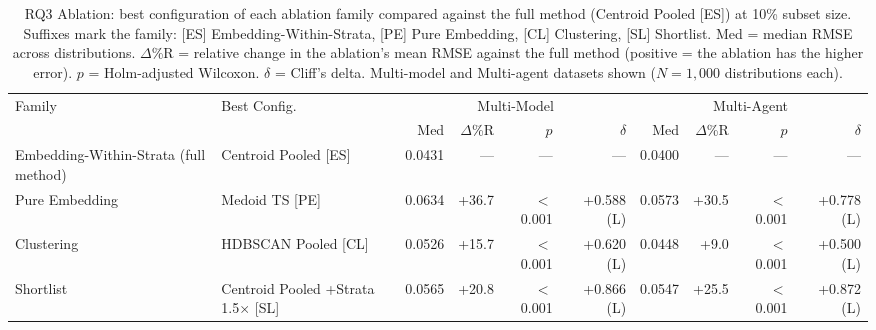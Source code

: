 \begin{table}[t]
\centering
\caption{RQ3 Ablation: best configuration of each ablation family compared against the full method (Centroid Pooled [ES]) at 10\% subset size. Suffixes mark the family: [ES] Embedding-Within-Strata, [PE] Pure Embedding, [CL] Clustering, [SL] Shortlist. Med = median RMSE across distributions. $\Delta$\%R = relative change in the ablation's mean RMSE against the full method (positive = the ablation has the higher error). $p$ = Holm-adjusted Wilcoxon. $\delta$ = Cliff's delta. Multi-model and Multi-agent datasets shown ($N{=}1{,}000$ distributions each).}
\label{tab:rq3-ablation}
\begin{tabular}{llrrrrrrrr}
\toprule
Family & Best Config. & \multicolumn{4}{c}{Multi-Model} & \multicolumn{4}{c}{Multi-Agent} \\
 &  & Med & $\Delta$\%R & $p$ & $\delta$ & Med & $\Delta$\%R & $p$ & $\delta$ \\
\midrule
Embedding-Within-Strata (full method) & Centroid Pooled [ES] & 0.0431 & --- & --- & --- & 0.0400 & --- & --- & --- \\
Pure Embedding & Medoid TS [PE] & 0.0634 & +36.7 & $<$0.001 & +0.588 (L) & 0.0573 & +30.5 & $<$0.001 & +0.778 (L) \\
Clustering & HDBSCAN Pooled [CL] & 0.0526 & +15.7 & $<$0.001 & +0.620 (L) & 0.0448 & +9.0 & $<$0.001 & +0.500 (L) \\
Shortlist & Centroid Pooled +Strata 1.5$\times$ [SL] & 0.0565 & +20.8 & $<$0.001 & +0.866 (L) & 0.0547 & +25.5 & $<$0.001 & +0.872 (L) \\
\bottomrule
\end{tabular}
\end{table}
